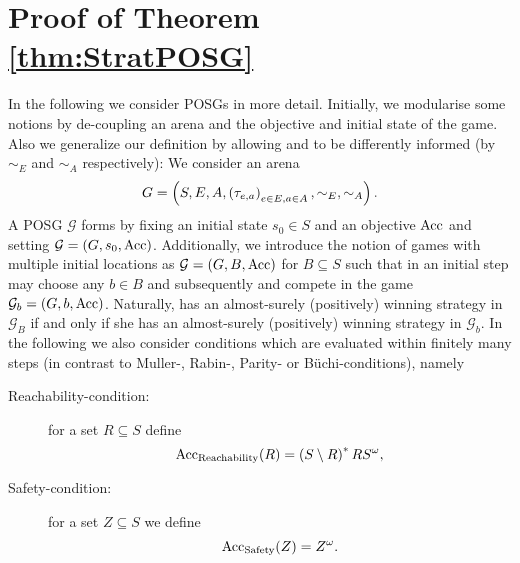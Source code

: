 \chapter{Proof of Theorem \ref{thm:StratPOSG}}
\label{app:POSG}
In the following we consider \acp{POSG} in more detail. Initially, we 
modularise some notions by de-coupling an arena and the objective and initial 
state of the game. Also we generalize our definition by allowing \eve{} and 
\adam{} to be differently informed (by $\sim_{E}$ and $\sim_{A}$ respectively):
We consider an arena
\begin{equation*}
  G = \left(S, E, A, \left(\tau_{e,a}\right)_{e\in E, a\in A}, \sim_{E}, \sim_{A}\right).
\end{equation*}
A \ac{POSG} $\mathcal{G}$ forms by fixing an initial state $s_{0}\in S$ and an 
objective $\operatorname{Acc}$ and setting $\mathcal{G} = \left(G, s_{0}, \operatorname{Acc}\right)$.  
Additionally, we introduce the notion of games with multiple initial locations 
as $\mathcal{G} = \left(G, B, \operatorname{Acc}\right)$ for $B\subseteq S$ such that in an 
initial step \adam{} may choose any $b\in B$ and subsequently \eve{} and 
\adam{} compete in the game $\mathcal{G}_{b} = \left(G, b, \operatorname{Acc}\right)$. Naturally, 
\eve{} has an almost-surely (positively) winning strategy in $\mathcal{G}_{B}$ 
if and only if she has an almost-surely (positively) winning strategy in 
$\mathcal{G}_{b}$. In the following we also consider conditions which are 
evaluated within finitely many steps (in contrast to Muller-, Rabin-, Parity-
or Büchi-conditions), namely
\begin{description}
  \item [Reachability-condition:] for a set $R\subseteq S$ define
    \begin{equation*}
      \operatorname{Acc}_{\operatorname{Reachability}}(R) = \left(S\setminus R\right)^{*}RS^{\omega},
    \end{equation*}
  \item [Safety-condition:] for a set $Z\subseteq S$ we define
    \begin{equation*}
      \operatorname{Acc}_{\operatorname{Safety}}(Z) = Z^{\omega}.
    \end{equation*}
\end{description}

